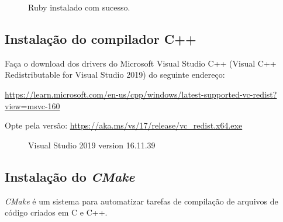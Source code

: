 \documentclass[a4paper,11pt]{article}
\newcommand{\cmake}{\textit{CMake}}
\begin{document}
\begin{figure}[H]
	\centering
	\caption{Ruby instalado com sucesso.}
	\label{fig:ruby_install_1}
\end{figure}

\subsection*{Instalação do compilador C++}
\label{compilador}

Faça o download dos drivers do Microsoft Visual Studio C++ (Visual C++ Redistributable for Visual Studio 2019) do seguinte endereço:

\url{https://learn.microsoft.com/en-us/cpp/windows/latest-supported-vc-redist?view=msvc-160}

Opte pela versão: \url{https://aka.ms/vs/17/release/vc_redist.x64.exe}

\begin{figure}[H]
	\centering
	\caption{Visual Studio 2019 version 16.11.39}\label{fig:msvc_build_2019}
\end{figure}

\subsection*{Instalação do \cmake{}}
\label{cmake}

\cmake{} é um sistema para automatizar tarefas de compilação de arquivos de código criados em C e C++. 
\end{document}
